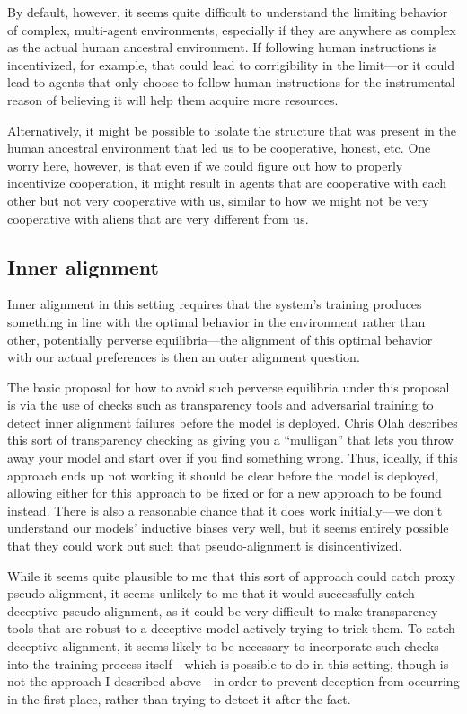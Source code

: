 \documentclass[
  onecolumn,
  natbib,
]{miri-tech-article}
\begin{document}
By default, however, it seems quite difficult to understand the limiting behavior of complex, multi-agent environments, especially if they are anywhere as complex as the actual human ancestral environment. If following human instructions is incentivized, for example, that could lead to corrigibility in the limit---or it could lead to agents that only choose to follow human instructions for the instrumental reason of believing it will help them acquire more resources. 

Alternatively, it might be possible to isolate the structure that was present in the human ancestral environment that led us to be cooperative, honest, etc. One worry here, however, is that even if we could figure out how to properly incentivize cooperation, it might result in agents that are cooperative with each other but not very cooperative with us, similar to how we might not be very cooperative with aliens that are very different from us.

\subsection{Inner alignment} Inner alignment in this setting requires that the system's training produces something in line with the optimal behavior in the environment rather than other, potentially perverse equilibria---the alignment of this optimal behavior with our actual preferences is then an outer alignment question.

The basic proposal for how to avoid such perverse equilibria under this proposal is via the use of checks such as transparency tools and adversarial training to detect inner alignment failures before the model is deployed. Chris Olah describes this sort of transparency checking as giving you a ``mulligan'' that lets you throw away your model and start over if you find something wrong.\cite{chris_olah} Thus, ideally, if this approach ends up not working it should be clear before the model is deployed, allowing either for this approach to be fixed or for a new approach to be found instead. There is also a reasonable chance that it does work initially---we don't understand our models' inductive biases very well, but it seems entirely possible that they could work out such that pseudo-alignment\cite{risks} is disincentivized.

While it seems quite plausible to me that this sort of approach could catch proxy pseudo-alignment, it seems unlikely to me that it would successfully catch deceptive pseudo-alignment, as it could be very difficult to make transparency tools that are robust to a deceptive model actively trying to trick them. To catch deceptive alignment, it seems likely to be necessary to incorporate such checks into the training process itself---which is possible to do in this setting, though is not the approach I described above---in order to prevent deception from occurring in the first place, rather than trying to detect it after the fact.
\end{document}
